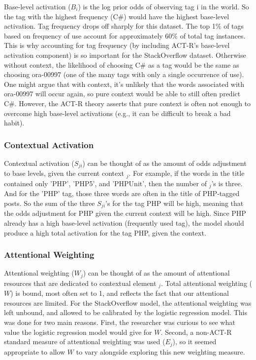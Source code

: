 \documentclass[10pt,letterpaper]{article}
\begin{document}
Base-level activation ($B_{i}$) is the log prior odds of observing tag i in the world.
So the tag with the highest frequency (C\#) would have the highest base-level activation.
Tag frequency drops off sharply for this dataset.
The top 1\% of tags based on frequency of use account for approximately 60\% of total tag instances.
This is why accounting for tag frequency (by including ACT-R's base-level activation component) is so important for the StackOverflow dataset.
Otherwise without context, the likelihood of choosing C\# as a tag would be the same as choosing ora-00997 (one of the many tags with only a single occurrence of use).
One might argue that with context, it's unlikely that the words associated with ora-00997 will occur again, so pure context would be able to still often predict C\#.
However, the ACT-R theory asserts that pure context is often not enough to overcome high base-level activations (e.g., it can be difficult to break a bad habit).

\subsubsection{Contextual Activation}

Contextual activation ($S_{ji}$) can be thought of as the amount of odds adjustment to base levels, given the current context $_{j}$.
For example, if the words in the title contained only 'PHP', 'PHP5', and 'PHPUnit', then the number of $_{j}$'s is three.
And for the 'PHP' tag, those three words are often in the title of PHP-tagged posts.
So the sum of the three $S_{ji}$'s for the tag PHP will be high, meaning that the odds adjustment for PHP given the current context will be high.
Since PHP already has a high base-level activation (frequently used tag), the model should produce a high total activation for the tag PHP, given the context.

\subsubsection{Attentional Weighting}

Attentional weighting ($W_{j}$) can be thought of as the amount of attentional resources that are dedicated to contextual element $_{j}$.
Total attentional weighting ($W$) is bound, most often set to 1, and reflects the fact that our attentional resources are limited.
For the StackOverflow model, the attentional weighting was left unbound, and allowed to be calibrated by the logistic regression model.
This was done for two main reasons.
First, the researcher was curious to see what value the logistic regression model would give for $W$.
Second, a non-ACT-R standard measure of attentional weighting was used ($E_{j}$), so it seemed appropriate to allow $W$ to vary alongside exploring this new weighting measure. 
\end{document}
